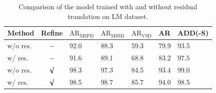 \documentclass[12pt,DIV14,BCOR12mm,a4paper,footinclude=false,headinclude,parskip=half-,twoside,openright,cleardoublepage=empty,toc=index,bibliography=totoc,listof=totoc]{scrreprt}
\numberwithin{equation}{chapter}
\begin{document}
\begin{table}[H]
  \centering
  \caption{Comparison of the model trained with and without residual translation on LM dataset.}
  \label{tab:ab_trans_lm}
  \begin{tabular}{l | c | C{16mm} C{16mm} C{16mm}| C{16mm}| C{16mm}}
      \toprule
      Method & Refine & $\text{AR}_{\text{MSPD}}$ & $\text{AR}_{\text{MSSD}}$ & $\text{AR}_{\text{VSD}}$ & AR & ADD(-S) \\
      \midrule
      w/o res. & $-$     & 92.0 & 88.3 & 59.3 & 79.9 & 93.5 \\
      w/ res.  & $-$     & 91.6 & 89.1 & 68.8 & $\mathbf{83.2}$ & $\mathbf{97.5}$ \\
      w/o res. & $\surd$ & 98.3 & 97.3 & 84.5 & 93.4 & $\mathbf{99.0}$ \\
      w/ res.  & $\surd$ & 98.5 & 98.7 & 85.7 & $\mathbf{94.0}$ & 98.5 \\
      \bottomrule
  \end{tabular}
\end{table}

\newpage
\end{document}
